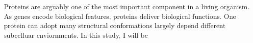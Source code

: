 Proteins are arguably one of the most important component in a living organism. As genes encode biological features, proteins deliver biological functions. One protein can adopt many structural conformations largely depend different subcelluar enviornments.    In this study, I will be 